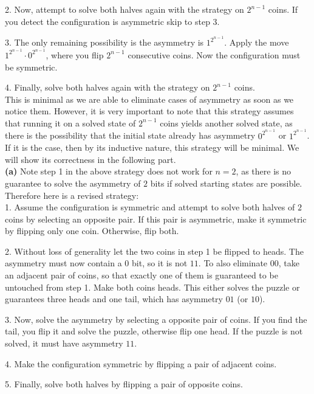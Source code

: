 \documentclass{article}
\begin{document}
    2. Now, attempt to solve both halves again with the strategy on $2^{n - 1}$ coins. If you detect the configuration is asymmetric skip to step 3.

    3. The only remaining possibility is the asymmetry is $1^{2^{n - 1}}$. Apply the move $1^{2^{n - 1}}\cdot 0^{2^{n - 1}}$, where you flip $2^{n - 1}$ consecutive coins. Now the configuration must be symmetric.

    4. Finally, solve both halves again with the strategy on $2^{n - 1}$ coins. \\

    This is minimal as we are able to eliminate cases of asymmetry as soon as we notice them. However, it is very important to note that this strategy assumes that running it on a solved state of $2^{n - 1}$ coins yields another solved state, as there is the possibility that the initial state already has asymmetry $0^{2^{n - 1}}$ or $1^{2^{n - 1}}$. If it is the case, then by its inductive nature, this strategy will be minimal. We will show its correctness in the following part. \\
    
	\textbf{(a)} Note step 1 in the above strategy does not work for $n = 2$, as there is no guarantee to solve the asymmetry of $2$ bits if solved starting states are possible. Therefore here is a revised strategy: \\

    1. Assume the configuration is symmetric and attempt to solve both halves of $2$ coins by selecting an opposite pair. If this pair is asymmetric, make it symmetric by flipping only one coin. Otherwise, flip both.
    
    2. Without loss of generality let the two coins in step 1 be flipped to heads. The asymmetry must now contain a $0$ bit, so it is not $11$. To also eliminate $00$, take an adjacent pair of coins, so that exactly one of them is guaranteed to be untouched from step 1. Make both coins heads. This either solves the puzzle or guarantees three heads and one tail, which has asymmetry $01$ (or $10$).

    3. Now, solve the asymmetry by selecting a opposite pair of coins. If you find the tail, you flip it and solve the puzzle, otherwise flip one head. If the puzzle is not solved, it must have asymmetry $11$.

    4. Make the configuration symmetric by flipping a pair of adjacent coins.

    5. Finally, solve both halves by flipping a pair of opposite coins. \\
\end{document}
